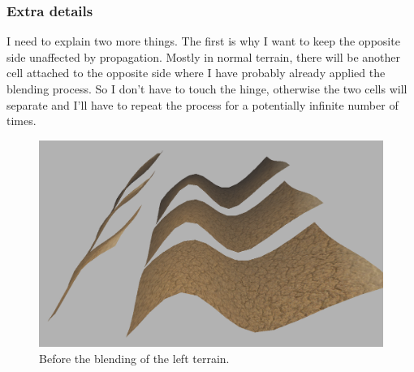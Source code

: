 \begin{figure}[hbt!]
	\centering
	\qquad
	\caption{}
	\label{fig::thirdTerrain}
\end{figure}

\subsubsection{Extra details}
I need to explain two more things. The first is why I want to keep the opposite side unaffected by propagation. Mostly in normal terrain, there will be another cell attached to the opposite side where I have probably already applied the blending process. So I don't have to touch the hinge, otherwise the two cells will separate and I'll have to repeat the process for a potentially infinite number of times.

\begin{figure}[hbt!]
	\centering
	\includegraphics[width= 0.60
	\textwidth]{images/terrain6.png}
	\caption{Before the blending of the left terrain.}
\end{figure} 


